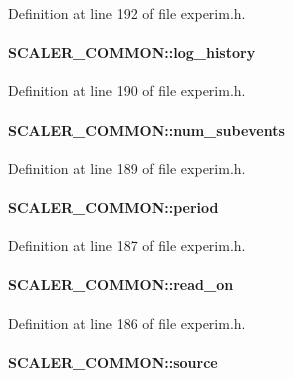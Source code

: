 Definition at line 192 of file experim.h.
\paragraph[{log\_\-history}]{ {\bf SCALER\_\-COMMON::log\_\-history}}\hfill\label{structSCALER__COMMON_a2f7babdcd42bdf0a7439e63ea9c3c591}


Definition at line 190 of file experim.h.
\paragraph[{num\_\-subevents}]{ {\bf SCALER\_\-COMMON::num\_\-subevents}}\hfill\label{structSCALER__COMMON_acb485a7a843d643210f4aa3f3da07857}


Definition at line 189 of file experim.h.
\paragraph[{period}]{ {\bf SCALER\_\-COMMON::period}}\hfill\label{structSCALER__COMMON_a6e02ab1ca7b39da2fa4b68177c49b9b4}


Definition at line 187 of file experim.h.
\paragraph[{read\_\-on}]{ {\bf SCALER\_\-COMMON::read\_\-on}}\hfill\label{structSCALER__COMMON_aec2ebbb3ea3ee002a0fbcaacb4099e96}


Definition at line 186 of file experim.h.
\paragraph[{source}]{ {\bf SCALER\_\-COMMON::source}}\hfill\label{structSCALER__COMMON_af90e3ff90a37f341b4a852f88dcc9b34}


